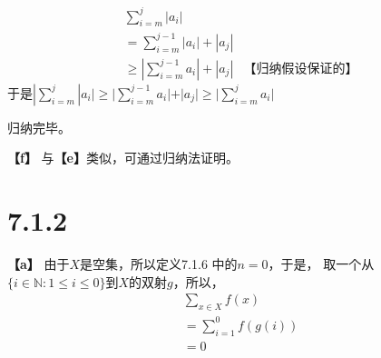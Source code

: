 \documentclass{article}
\theoremstyle{mystyle}
\begin{document}
\begin{align*}
    & \sum \limits_{i=m}^j |a_i|                                       \\
    & = \sum \limits_{i=m}^{j-1} |a_i| + |a_j|                         \\
    & \geq |\sum \limits_{i=m}^{j-1} a_i| + |a_j| & \textbf{【归纳假设保证的】}
\end{align*}
于是$|\sum \limits_{i=m}^j |a_i| \geq |\sum \limits_{i=m}^{j-1} a_i| + |a_j| \geq |\sum \limits_{i=m}^j a_i|$

归纳完毕。

\textbf{【f】} 与\textbf{【e】}类似，可通过归纳法证明。

\section*{7.1.2}

\textbf{【a】}
由于$X$是空集，所以定义7.1.6 中的$n=0$，于是，
取一个从$\{i \in \mathbb{N}: 1 \leq i \leq 0\}$到$X$的双射$g$，所以，
\begin{align*}
    & \sum \limits_{x \in X}f(x)    \\
    & =\sum \limits_{i=1}^0f(g(i)) \\
    & = 0
\end{align*}
\end{document}
